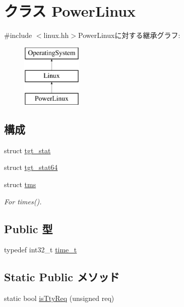 \hypertarget{classPowerLinux}{
\section{クラス PowerLinux}
\label{classPowerLinux}
}


{\ttfamily \#include $<$linux.hh$>$}PowerLinuxに対する継承グラフ:\begin{figure}[H]
\begin{center}
\leavevmode
\includegraphics[height=3cm]{classPowerLinux}
\end{center}
\end{figure}
\subsection*{構成}
\begin{DoxyCompactItemize}
\item 
struct \hyperlink{structPowerLinux_1_1tgt__stat}{tgt\_\-stat}
\item 
struct \hyperlink{structPowerLinux_1_1tgt__stat64}{tgt\_\-stat64}
\item 
struct \hyperlink{structPowerLinux_1_1tms}{tms}
\begin{DoxyCompactList}\small\item\em For times(). \item\end{DoxyCompactList}\end{DoxyCompactItemize}
\subsection*{Public 型}
\begin{DoxyCompactItemize}
\item 
typedef int32\_\-t \hyperlink{classPowerLinux_a9c837e14046ebcf4099bb559bd6637ca}{time\_\-t}
\end{DoxyCompactItemize}
\subsection*{Static Public メソッド}
\begin{DoxyCompactItemize}
\item 
static bool \hyperlink{classPowerLinux_ab20bdd4422ecf6e1736a5587be296b3f}{isTtyReq} (unsigned req)
\end{DoxyCompactItemize}
